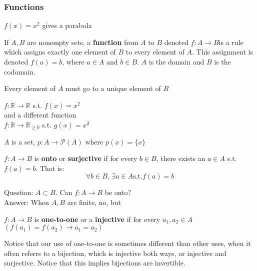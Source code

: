 \documentclass[11pt]{scrartcl}
\begin{document}
\subsubsection{Functions}
\begin{example}
    $f(x) = x^2$ gives a parabola
\end{example}
\begin{definition}[Function]
    If $A, B$ are nonempty sets, a \textbf{function} from $A$ to $B$ denoted $f: A \rightarrow B$is a rule which assigns exactly one element of $B$ to every element of $A$.  This assignment is denoted $f(a) = b$, where $a \in A$ and $b \in B$.  $A$ is the domain and $B$ is the codomain.
\end{definition}
\begin{remark}
    Every element of $A$ must go to a unique element of $B$
\end{remark}
\begin{example}
    $f : \mathbb{R} \rightarrow \mathbb{R}$ s.t. $f(x) = x^2$ \\ and a different function \\
    $f: \mathbb{R} \rightarrow \mathbb{R}_{\geq 0}$ s.t. $g(x) = x^2$
\end{example}
\begin{example}
    $A$ is a set, $p: A \rightarrow \mathcal{P}(A)$ where $p(x) = \{x\}$
\end{example}
\begin{definition}[Surjections]
    $f: A \rightarrow B$ is \textbf{onto} or \textbf{surjective} if for every $b \in B$, there exists an $a \in A$ s.t. $f(a) = b$.  That is: $$\forall b \in B\text{, } \exists a \in A \text{s.t.} f(a) = b$$
\end{definition}
\begin{example}
    Question: $A \subset B$. Can $f: A \rightarrow B$ be onto?\\
    Answer: When $A, B$ are finite, no, but 
\end{example}
\begin{definition}[Injections]
    $f: A \rightarrow B$ is \textbf{one-to-one} or a \textbf{injective} if for every $a_1, a_2 \in A$ $(f(a_1) = f(a_2) \rightarrow a_1 = a_2)$
\end{definition}
\begin{remark}[Bijections]
    Notice that our use of one-to-one is sometimes different than other uses, when it often referrs to a bijection, which is injective both ways, or injective and surjective. Notice that this implies bijections are invertible.
\end{remark}
\end{document}
